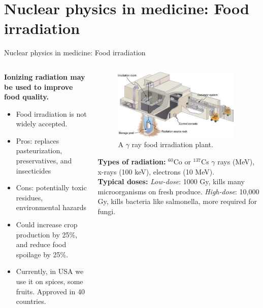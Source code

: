 \documentclass{beamer}
\begin{document}
\section{Nuclear physics in medicine: Food irradiation}

\begin{frame}{Nuclear physics in medicine: Food irradiation}
\begin{columns}[T]
\begin{column}{0.45\textwidth}
\footnotesize
\textbf{\alert{Ionizing radiation may be used to improve food quality.}}
\begin{itemize}
\item Food irradiation is not widely accepted.
\item Pros: replaces pasteurization, preservatives, and insecticides
\item Cons: potentially toxic residues, environmental hazards
\item Could increase crop production by 25\%, and reduce food spoilage by 25\%.
\item Currently, in USA we use it on spices, some fruits. Approved in 40 countries.
\end{itemize}
\end{column}
\begin{column}{0.55\textwidth}
\footnotesize
\begin{figure}
\centering
\includegraphics[width=0.95\textwidth]{figures/irradiation.png}
\caption{\label{fig:irradiation} \footnotesize A $\gamma$ ray food irradiation plant.}
\end{figure}
\textbf{Types of radiation:}
$^{60}$Co or $^{137}$Cs $\gamma$ rays (MeV), x-rays (100 keV), electrons (10 MeV). \\ \vspace{0.1cm}
\textbf{Typical doses:}
\textit{Low-dose}: 1000 Gy, kills many microorganisms on fresh produce. \textit{High-dose}: 10,000 Gy, kills bacteria like salmonella, more required for fungi.
\end{column}
\end{columns}
\end{frame}
\end{document}
